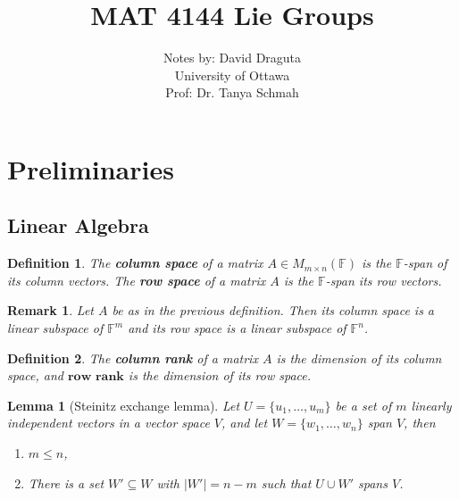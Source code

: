 \documentclass[12pt]{article}
\newcommand{\card}[1]{|#1|}
\newcommand\set[1]{\{#1\}}
\newtheorem{defn}{Definition}[thm]
\newtheorem*{remark}{Remark}
\newtheorem{lemma}{Lemma}[thm]
\begin{document}
\tableofcontents
\date{}

\title{MAT 4144 Lie Groups}
\author{Notes by: David Draguta
  \\University of Ottawa\\ Prof: Dr. Tanya Schmah } 
 
\maketitle
\section{Preliminaries}


\subsection{Linear Algebra}
\begin{defn}
  The \textbf{column space} of a matrix $A \in M_{m \times n}(\mathbb{F})$ is the $\mathbb{F}$-span of its column vectors. The \textbf{row space} of a matrix $A$ is the $\mathbb{F}$-span its row vectors. 
\end{defn}
\begin{remark}
  Let $A$ be as in the previous definition. Then its  column space is a linear subspace of $\mathbb{F}^m$ and its row space is a linear subspace of $\mathbb{F}^n$.
\end{remark}
\begin{defn}
  The \textbf{column rank} of a matrix $A$ is the dimension of its column space, and $\textbf{row rank}$ is the dimension of its row space.
\end{defn}
\begin{lemma}[Steinitz exchange lemma]
  Let $U= \set{u_1, \dots, u_m}$ be a set of $m$ linearly independent vectors in a vector space $V$,
  and let $W=\set{w_1, \dots, w_n}$ span $V$, then
  \begin{enumerate}
  \item $m \leq n$, 
  \item There is a set $W' \subseteq W$ with $\card{W'} = n - m$ such that $U \cup W'$ spans $V$.
  \end{enumerate}
\end{lemma}
\end{document}
